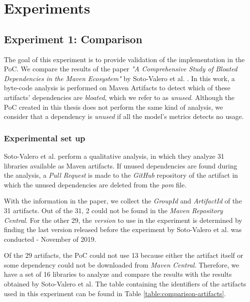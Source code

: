 \chapter{Experiments}\label{ch:Experiments}

\section{Experiment 1: Comparison}\label{sec:Exp1}
The goal of this experiment is to provide validation of the implementation in the PoC. We compare the results of the paper \textit{"A Comprehensive Study of Bloated Dependencies in the Maven Ecosystem"} by Soto-Valero et al. \cite{soto2020comprehensive}. In this work, a byte-code analysis is performed on Maven Artifacts to detect which of these artifacts' dependencies are \textit{bloated}, which we refer to as \textit{unused}. Although the PoC created in this thesis does not perform the same kind of analysis, we consider that a dependency is \textit{unused} if all the model's metrics detects no usage.

\subsection{Experimental set up}
Soto-Valero et al. perform a qualitative analysis, in which they analyze 31 libraries available as Maven artifacts. If unused dependencies are found during the analysis, a \textit{Pull Request} is made to the \textit{GitHub} repository of the artifact in which the unused dependencies are deleted from the \textit{pom} file.

With the information in the paper, we collect the \textit{GroupId} and \textit{ArtifactId} of the 31 artifacts. Out of the 31, 2 could not be found in the \textit{Maven Repository Central}. For the other 29, the \textit{version} to use in the experiment is determined by finding the last version released before the experiment by Soto-Valero et al. was conducted - November of 2019.

Of the 29 artifacts, the PoC could not use 13 because either the artifact itself or some dependency could not be downloaded from \textit{Maven Central}. Therefore, we have a set of 16 libraries to analyze and compare the results with the results obtained by Soto-Valero et al. The table containing the identifiers of the artifacts used in this experiment can be found in Table \ref{table:comparison-artifacts}.

